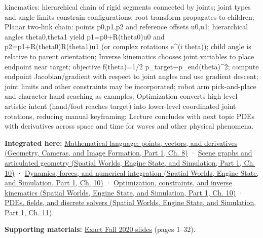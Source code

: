 kinematics: hierarchical chain of rigid segments connected by joints; joint types and angle limits constrain configurations; root transform propagates to children; Planar two-link chain: points p0,p1,p2 and reference offsets u0,u1; hierarchical angles theta0,theta1 yield p1=p0+R(theta0)u0 and p2=p1+R(theta0)R(theta1)u1 (or complex rotations e\^{}(i theta)); child angle is relative to parent orientation; Inverse kinematics chooses joint variables to place endpoint near target; objective f(theta)=1/2 \textbar\textbar p\_target−p\_end(theta)\textbar\textbar\^{}2; compute endpoint Jacobian/gradient with respect to joint angles and use gradient descent; joint limits and other constraints may be incorporated; robot arm pick-and-place and character hand reaching as examples; Optimization converts high-level artistic intent (hand/foot reaches target) into lower-level coordinated joint rotations, reducing manual keyframing; Lecture concludes with next topic PDEs with derivatives across space and time for waves and other physical phenomena.

\textbf{Integrated here:} \href{../03-Geometry-Cameras-and-Image-Formation-P01/main.pdf\#nameddest=03-visual-computing-i-ch001-mathematical-language-points-vectors-and-derivatives}{Mathematical language: points, vectors, and derivatives (Geometry, Cameras, and Image Formation, Part 1, Ch. 8)} · \href{../05-Spatial-Worlds-Engine-State-and-Simulation-P01/main.pdf\#nameddest=04-visual-computing-ii-ch029-scene-graphs-and-articulated-geometry}{Scene graphs and articulated geometry (Spatial Worlds, Engine State, and Simulation, Part 1, Ch. 10)} · \href{../05-Spatial-Worlds-Engine-State-and-Simulation-P01/main.pdf\#nameddest=04-visual-computing-ii-ch029-dynamics-forces-and-numerical-integration}{Dynamics, forces, and numerical integration (Spatial Worlds, Engine State, and Simulation, Part 1, Ch. 10)} · \href{../05-Spatial-Worlds-Engine-State-and-Simulation-P01/main.pdf\#nameddest=04-visual-computing-ii-ch029-optimization-constraints-and-inverse-kinematics}{Optimization, constraints, and inverse kinematics (Spatial Worlds, Engine State, and Simulation, Part 1, Ch. 10)} · \href{../05-Spatial-Worlds-Engine-State-and-Simulation-P01/main.pdf\#nameddest=04-visual-computing-ii-ch030-pdes-fields-and-discrete-solvers}{PDEs, fields, and discrete solvers (Spatial Worlds, Engine State, and Simulation, Part 1, Ch. 11)}.

\textbf{Supporting materials:} \href{https://15462.courses.cs.cmu.edu/fall2020content/lectures/22_optimization/22_optimization_slides.pdf}{Exact Fall 2020 slides} (pages 1--32).

